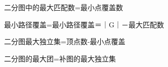 \item 二分图中的最大匹配数=最小点覆盖数
\item 最小路径覆盖=最小路径覆盖＝｜G｜－最大匹配数
\item 二分图最大独立集=顶点数-最小点覆盖
\item 二分图的最大团=补图的最大独立集
